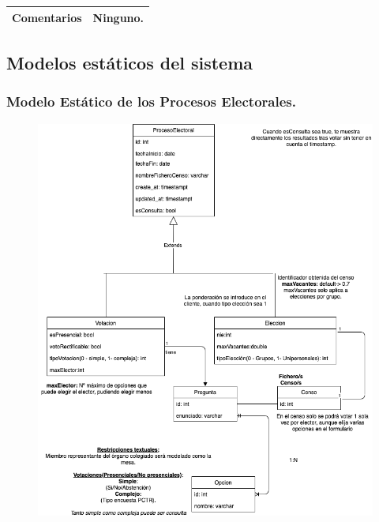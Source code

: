 \documentclass[12pt,letterpaper]{report}
\begin{document}
\begin{table}[htp]
{\begin{tabular}{|c|c|}
				Comentarios      & Ninguno.                                                                                                                                                                                                                     \\ \hline
			\end{tabular}}
		\end{table}
	
	\subsection{Modelos estáticos del sistema}

		\subsubsection{Modelo Estático de los Procesos Electorales.}
			\begin{figure}[htp]
				\centering
				\includegraphics[width=0.9\linewidth]{img/MEProcesosElectorales}
				\caption{}
				\label{fig:meprocesoselectorales}
			\end{figure}
		\newpage
		
\end{document}

